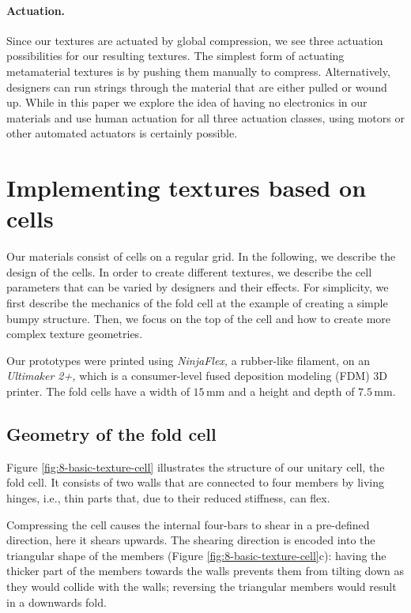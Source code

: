 \paragraph{Actuation.} Since our textures are actuated by global compression, we see three actuation possibilities for our resulting textures. The simplest form of actuating metamaterial textures is by pushing them manually to compress. Alternatively, designers can run strings through the material that are either pulled or wound up. While in this paper we explore the idea of having no electronics in our materials and use human actuation for all three actuation classes, using motors or other automated actuators is certainly possible.


\section{Implementing textures based on cells}

Our materials consist of cells on a regular grid. In the following, we describe the design of the cells. In order to create different textures, we describe the cell parameters that can be varied by designers and their effects. For simplicity, we first describe the mechanics of the fold cell at the example of creating a simple bumpy structure. Then, we focus on the top of the cell and how to create more complex texture geometries.

Our prototypes were printed using \textit{NinjaFlex,} a rubber-like filament, on an \textit{Ultimaker 2+,} which is a consumer-level fused deposition modeling (FDM) 3D printer. The fold cells have a width of $15\, \mathrm{mm}$ and a height and depth of $7.5\, \mathrm{mm}$. 


\subsection{Geometry of the fold cell}

Figure \ref{fig:8-basic-texture-cell} illustrates the structure of our unitary cell, the fold cell. It consists of two walls that are connected to four members by living hinges, i.e., thin parts that, due to their reduced stiffness, can flex.

Compressing the cell causes the internal four-bars to shear in a pre-defined direction, here it shears upwards. The shearing direction is encoded into the triangular shape of the members (Figure \ref{fig:8-basic-texture-cell}c): having the thicker part of the members towards the walls prevents them from tilting down as they would collide with the walls; reversing the triangular members would result in a downwards fold.

